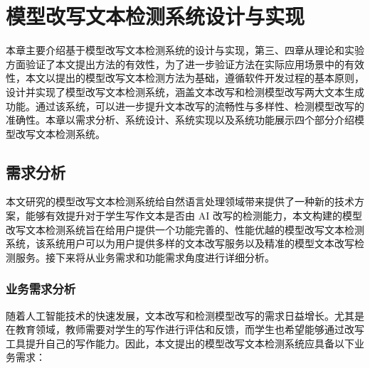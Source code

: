 

\chapter{模型改写文本检测系统设计与实现}
\label{chap:sys}

本章主要介绍基于模型改写文本检测系统的设计与实现，第三、四章从理论和实验方面验证了本文提出方法的有效性，为了进一步验证方法在实际应用场景中的有效性，本文以提出的模型改写文本检测方法为基础，遵循软件开发过程的基本原则，设计并实现了模型改写文本检测系统，涵盖文本改写和检测模型改写两大文本生成功能。通过该系统，可以进一步提升文本改写的流畅性与多样性、检测模型改写的准确性。本章以需求分析、系统设计、系统实现以及系统功能展示四个部分介绍模型改写文本检测系统。

\section{需求分析}
\label{sec:sys-need}

本文研究的模型改写文本检测系统给自然语言处理领域带来提供了一种新的技术方案，能够有效提升对于学生写作文本是否由 AI 改写的检测能力，本文构建的模型改写文本检测系统旨在给用户提供一个功能完善的、性能优越的模型改写文本检测系统，该系统用户可以为用户提供多样的文本改写服务以及精准的模型文本改写检测服务。接下来将从业务需求和功能需求角度进行详细分析。

\subsection{业务需求分析}
\label{sec:sys-bus-need}

随着人工智能技术的快速发展，文本改写和检测模型改写的需求日益增长。尤其是在教育领域，教师需要对学生的写作进行评估和反馈，而学生也希望能够通过改写工具提升自己的写作能力。因此，本文提出的模型改写文本检测系统应具备以下业务需求：

